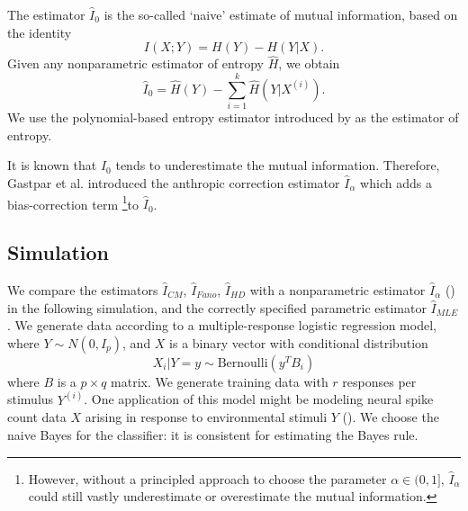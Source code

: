 The estimator $\hat{I}_0$ is the so-called `naive' estimate of mutual information, based on the identity
\[
I(X;Y) = H(Y) - H(Y|X).
\]
Given any nonparametric estimator of entropy $\hat{H}$, we obtain
\[
\hat{I}_0 = \hat{H}(Y) - \sum_{i=1}^k \hat{H}(Y|X^{(i)}).
\]
We use the polynomial-based entropy estimator introduced by
\cite{jiao2015minimax} as the estimator of entropy.  

It is known that $\hat{I}_0$ tends to underestimate the mutual
information.  Therefore, Gastpar et al. introduced the anthropic
correction estimator $\hat{I}_\alpha$ which adds a bias-correction
term \footnote{However, without a principled approach to choose the
  parameter $\alpha \in (0,1]$, $\hat{I}_\alpha$ could still vastly
underestimate or overestimate the mutual information.}to $\hat{I}_0$.

\subsection{Simulation}

We compare the estimators $\hat{I}_{CM}$, $\hat{I}_{Fano}$,
$\hat{I}_{HD}$ with a nonparametric estimator $\hat{I}_\alpha$
(\cite{Gastpar2009}) in the following simulation, and the correctly
specified parametric estimator $\hat{I}_{MLE}$.  We generate data
according to a multiple-response logistic regression model, where $ Y
\sim N(0, I_p) $, and $X$ is a binary vector with conditional
distribution
\[
X_i|Y = y \sim \text{Bernoulli}(y^T B_i)
\]
where $B$ is a $p \times q$ matrix.  We generate training data with
$r$ responses per stimulus $Y^{(i)}$.  One application of this model
might be modeling neural spike count data $X$ arising in response to
environmental stimuli $Y$ (\cite{banerjee2012parametric}).  We choose
the naive Bayes for the classifier: it is consistent for
estimating the Bayes rule.

